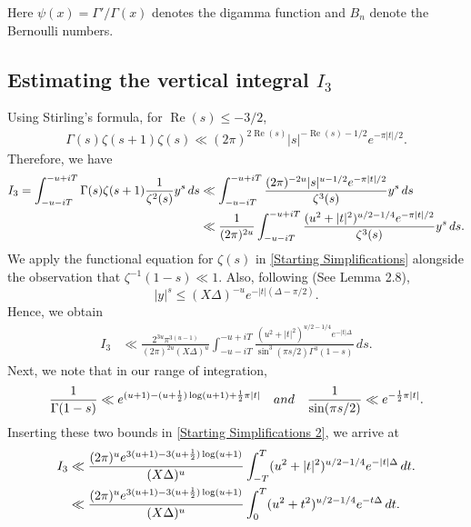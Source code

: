 \documentclass[11pt]{amsart}
\numberwithin{equation}{section}
\numberwithin{figure}{section}
\theoremstyle{definition}
\begin{document}
Here $\psi(x) = \Gamma'/\Gamma(x)$ denotes the digamma function and $B_n$ denote the Bernoulli numbers. 

\subsection*{Estimating the vertical integral $I_3$} Using Stirling's formula, for $\operatorname{Re}(s) \leqslant-3/2$,
\begin{align}\label{Stirling Formula}
\Gamma(s)\zeta(s+1)\zeta(s) \ll (2 \pi)^{2\operatorname{Re}(s)}\lvert s \rvert^{-\operatorname{Re}(s)-1/2} e^{-\pi \lvert t \rvert/2}. 
\end{align}
Therefore, we have
\begin{align}\label{Starting Simplifications}
    I_3 = \int_{-u-iT}^{-u+iT} \Gamma(s)\zeta(s+1)\frac{1}{\zeta^2(s)}y^s \,ds &\ll \int_{-u-iT}^{-u+iT} \frac{(2 \pi)^{-2u}\lvert s \rvert^{u-1/2} e^{-\pi \lvert t \rvert/2}}{\zeta^3(s)}y^s \,ds \notag \\
    &\ll \frac{1}{(2\pi)^{2u}} \int_{-u-iT}^{-u+iT} \frac{(u^2+\lvert t \rvert^2 )^{u/2-1/4} e^{-\pi \lvert t \rvert/2}}{\zeta^3(s)}y^s \,ds.
\end{align}
We apply the functional equation for $\zeta(s)$ in \eqref{Starting Simplifications} alongside the observation that $\zeta^{-1}(1-s) \ll 1$. Also, following \cite{vaughansquares} (See Lemma 2.8),
\[
\lvert y \rvert^s \leqslant(X\Delta)^{-u}e^{-\lvert t \rvert(\Delta-\pi/2)}.\]
Hence, we obtain
\begin{align}\label{Starting Simplifications 2}
    I_3 &\ll \frac{2^{3u} \pi^{3(u-1)}}{(2\pi)^{2u} (X \Delta)^{u}} \int_{-u-iT}^{-u+iT} \frac{(u^2+\lvert t \rvert^2 )^{u/2-1/4} e^{-\lvert t \rvert \Delta}}{\sin^3(\pi s/2)\Gamma^3(1-s)} \,ds.
\end{align}
Next, we note that in our range of integration,
\begin{align*}
    \frac{1}{\Gamma(1-s)} \ll e^{(u+1) - (u+\frac{1}{2})\log (u+1) + \frac{1}{2}\pi |t|} \quad \textnormal{and} \quad \frac{1}{\sin(\pi s/2)} \ll e^{- \frac{1}{2}\pi |t|}.
\end{align*}
Inserting these two bounds in \eqref{Starting Simplifications 2}, we arrive at 
\begin{align}\label{Penultimate Bounds}
    I_3 &\ll \frac{(2\pi)^{u}e^{3(u+1) - 3(u+\frac{1}{2})\log (u+1)}}{ (X \Delta)^{u}} \int_{-T}^{T} (u^2+\lvert t \rvert^2 )^{u/2-1/4} e^{-\lvert t \rvert \Delta} \,dt. \notag \\
    &\ll \frac{(2\pi)^{u}e^{3(u+1) - 3(u+\frac{1}{2})\log (u+1)}}{ (X \Delta)^{u}} \int_{0}^{T} (u^2+t^2 )^{u/2-1/4} e^{-t \Delta} \,dt.
\end{align}
\end{document}
